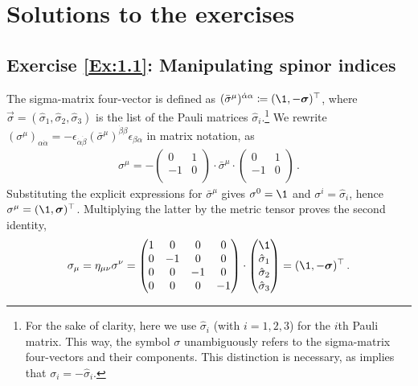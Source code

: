 \chapter{Solutions to the exercises}
\label{ch:solutions}

\section*{Exercise \ref{Ex:1.1}: Manipulating spinor indices}
\label{Prob:1.1}
%
The sigma-matrix four-vector is defined as $(\bar{\sigma}^{\mu})^{\dot{\alpha} \alpha} \coloneqq (\1,-\vec\sigma)^{\top}$, where $\vec\sigma = (\hat\sigma_1,\hat\sigma_2, \hat\sigma_3)$ is the list of the Pauli matrices $\hat\sigma_i$.\footnote{For the sake of clarity, here we use $\hat{\sigma}_i$ (with $i=1,2,3$) for the $i$th Pauli matrix. This way, the symbol $\sigma$ unambiguously refers to the sigma-matrix four-vectors and their components. This distinction is necessary, as  implies that $\sigma_i = - \hat\sigma_i$.} We rewrite $(\sigma^{\mu})_{\alpha \dot\alpha} = - \epsilon_{\dot\alpha \dot\beta} (\bar{\sigma}^{\mu})^{\dot\beta \beta} \epsilon_{\beta \alpha}$ in matrix notation, as
\begin{align}
\sigma^{\mu} = - \begin{pmatrix} 0 & 1 \\ -1 & 0 \\ \end{pmatrix} \cdot \bar{\sigma}^{\mu} \cdot \begin{pmatrix} 0 & 1 \\ -1 & 0 \\ \end{pmatrix} \,.
\end{align}
Substituting the explicit expressions for $\bar{\sigma}^{\mu}$ gives $\sigma^0 = \1$ and $\sigma^i = \hat\sigma_i$, hence $\sigma^{\mu} = (\1, \vec\sigma)^{\top}$. Multiplying the latter by the metric tensor proves the second identity,
\begin{align} \label{eq:sigmalowermu}
\sigma_{\mu} = \eta_{\mu \nu} \sigma^{\nu} = \begin{pmatrix} 1 & 0 & 0 & 0 \\ 0 & -1 & 0 & 0 \\ 0 & 0 & -1 & 0 \\ 0 & 0 & 0 & -1 \\ \end{pmatrix} \cdot \begin{pmatrix} \1 \\ \hat\sigma_1 \\ \hat\sigma_2 \\ \hat\sigma_3 \\ \end{pmatrix} = (\1, -\vec\sigma)^{\top} \,.
\end{align}

